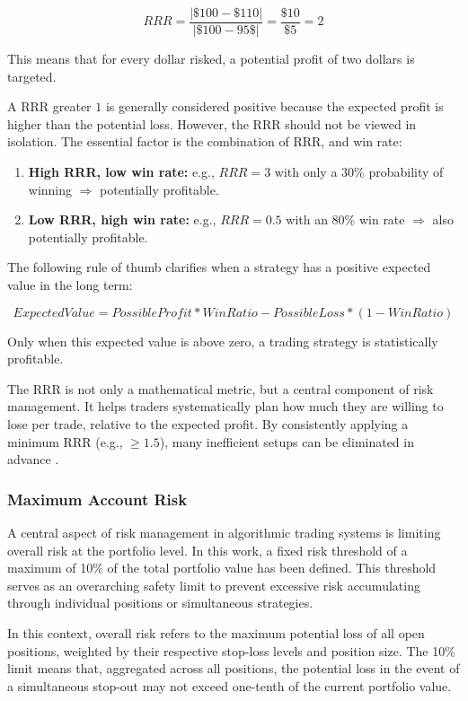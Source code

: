 \[
    RRR = \frac{|\$100 - \$110|}{|\$100 - 95\$|} = \frac{\$10}{\$5} = 2
\]

\noindent
This means that for every dollar risked, a potential profit of two dollars is targeted.

A RRR greater $1$ is generally considered positive because the expected profit is higher than the potential loss.
However, the RRR should not be viewed in isolation.
The essential factor is the combination of RRR, and win rate:

\begin{enumerate}
    \item \textbf{High RRR, low win rate:} e.g., $RRR=3$ with only a 30\% probability of winning $\Rightarrow$ potentially profitable.
    \item \textbf{Low RRR, high win rate:} e.g., $RRR=0.5$ with an 80\% win rate $\Rightarrow$ also potentially profitable.
\end{enumerate}

\noindent
The following rule of thumb clarifies when a strategy has a positive expected value in the long term:

\[
    ExpectedValue = PossibleProfit * WinRatio - PossibleLoss * (1 - WinRatio)
\]

\noindent
Only when this expected value is above zero, a trading strategy is statistically profitable.

The RRR is not only a mathematical metric, but a central component of risk management.
It helps traders systematically plan how much they are willing to lose per trade, relative to the expected profit.
By consistently applying a minimum RRR (e.g., $\ge 1.5$), many inefficient setups can be eliminated in advance \cite{bitpanda-crv}.

\subsubsection{Maximum Account Risk}

A central aspect of risk management in algorithmic trading systems is limiting overall risk at the portfolio level.
In this work, a fixed risk threshold of a maximum of 10\% of the total portfolio value has been defined.
This threshold serves as an overarching safety limit to prevent excessive risk accumulating through individual positions or simultaneous strategies.

In this context, overall risk refers to the maximum potential loss of all open positions, weighted by their respective stop-loss levels and position size.
The 10\% limit means that, aggregated across all positions, the potential loss in the event of a simultaneous stop-out may not exceed one-tenth of the current portfolio value.

